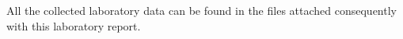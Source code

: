 

{All the collected laboratory data can be found in the files attached consequently with this laboratory report.}



